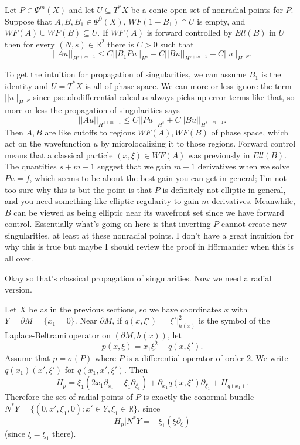 \documentclass[12pt]{article}
\newcommand{\RR}{\mathbb{R}}
\begin{document}
\begin{theorem}
Let $P \in \Psi^m(X)$ and let $U \subseteq T^*X$ be a conic open set of nonradial points for $P$.
Suppose that $A,B,B_1 \in \Psi^0(X)$, $WF(1 - B_1) \cap U$ is empty, and $WF(A) \cup WF(B) \subseteq U$.
If $WF(A)$ is forward controlled by $Ell(B)$ in $U$ then for every $(N, s) \in \RR^2$ there is $C > 0$ such that
$$||Au||_{H^{s+m-1}} \leq C||B_1Pu||_{H^s} + C||Bu||_{H^{s+m-1}} + C||u||_{H^{-N}}.$$
\end{theorem}
To get the intuition for propagation of singularities, we can assume $B_1$ is the identity and $U = T^*X$ is all of phase space.
We can more or less ignore the term $||u||_{H^{-N}}$ since pseudodifferential calculus always picks up error terms like that, so more or less the propagation of singularities says
$$||Au||_{H^{s+m-1}} \leq C||Pu||_{H^s} + C||Bu||_{H^{s+m-1}}.$$
Then $A, B$ are like cutoffs to regions $WF(A),WF(B)$ of phase space, which act on the wavefunction $u$ by microlocalizing it to those regions.
Forward control means that a classical particle $(x, \xi) \in WF(A)$ was previously in $Ell(B)$.
The quantities $s + m - 1$ suggest that we gain $m - 1$ derivatives when we solve $Pu = f$, which seems to be about the best gain you can get in general; I'm not too sure why this is but the point is that $P$ is definitely not elliptic in general, and you need something like elliptic regularity to gain $m$ derivatives.
Meanwhile, $B$ can be viewed as being elliptic near its wavefront set since we have forward control.
Essentially what's going on here is that inverting $P$ cannot create new singularities, at least at these nonradial points.
I don't have a great intuition for why this is true but maybe I should review the proof in H\"ormander when this is all over.

Okay so that's classical propagation of singularities. Now we need a radial version.

Let $X$ be as in the previous sections, so we have coordinates $x$ with $Y = \partial M = \{x_1 = 0\}$.
Near $\partial M$, if $q(x, \xi') = |\xi'|^2_{h(x)}$ is the symbol of the Laplace-Beltrami operator on $(\partial M, h(x))$, let
$$p(x, \xi) = x_1\xi_1^2 + q(x, \xi').$$
Assume that $p = \sigma(P)$ where $P$ is a differential operator of order $2$.
We write $q(x_1)(x', \xi')$ for $q(x_1, x', \xi')$. Then
$$H_p = \xi_1(2x_1 \partial_{x_1} - \xi_1 \partial_{\xi_1}) + \partial_{x_1} q(x, \xi') \partial_{\xi_1} + H_{q(x_1)}.$$
Therefore the set of radial points of $P$ is exactly the conormal bundle $N^*Y = \{(0, x', \xi_1, 0): x' \in Y, \xi_1 \in \RR\}$,
since
$$H_p|N^*Y = -\xi_1(\xi\partial_\xi)$$
(since $\xi = \xi_1$ there).
\end{document}
